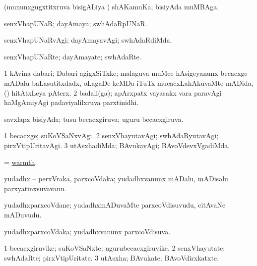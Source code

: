 \bentry
{} 
\gl{\nA}
\expl{}
\bmng
(mununxgugxtitxruva bisigALiya \vi) shAKamuKa; bisiyAda muMBAga. 
\emng
\eentry

\bentry
{} 
\gl{\gu}
\expl{}
\bmng
senxVhapUNaR; dayAmaya; swhAdaRpUNaR. 
\emng
\eentry

\bentry
{} 
\gl{\kirxvi}
\expl{}
\bmng
senxVhapUNaRvAgi; dayAmayavAgi; swhAdaRdiMda. 
\emng
\eentry

\bentry
{} 
\gl{\nA}
\expl{}
\bmng
senxVhapUNaRte; dayAmayate; swhAdaRte. 
\emng
\eentry

\bentry
{} 
\gl{\nA}
\expl{}
\bmng
\bnum
\num{1} kAvina dabari; Dabari agigxSiTxke; malaguva muMce hAsigeyanunx becacxge mADalu baLasutitxdadx, oLagaDe keMDa iTuTx mucacxLahAkuvaMte mADida, (\sA) hitAtxLeya pAterx. 
\num{2} badali(ga); apArxpatx vayasakx \mo vara paravAgi haMgAmiyAgi padaviyalilxruva parxtinidhi. 
\enum
\emng
\eentry

\bentry
{} 
\gl{\gu}
\expl{}
\bmng
savxlapx bisiyAda; tusu becacxgiruva; uguru becacxgiruva. 
\emng
\eentry

\bentry
{} 
\gl{\kirxvi}
\expl{}
\bmng
\bnum
\num{1} becacxge; suKoVSaNxvAgi. 
\num{2} senxVhayutavAgi; swhAdaRyutavAgi; pirxVtipUritavAgi. 
\num{3} utAsxhadiMda; BAvukavAgi; BAvoVdevxVgadiMda. 
\enum
\emng
\eentry

\bentry
{} 
\gl{\nA}
\expl{}
\bmng
= \hyperlink{warmth}{warmth}. 
\emng
\eentry

\bentry
{} 
\gl{\nA}
\expl{}
\bmng
yudadhx -- perxVraka, parxcoVdaka; yudadhxvanunx mADalu, mADisalu parxyatinxsuvavanu. 
\emng
\eentry

\bentry
{} 
\gl{\nA}
\expl{}
\bmng
yudadhxparxcoVdane; yudadhxmADuvaMte parxcoVdisuvudu, citAvaNe mADuvudu. 
\emng
\eentry

\bentry
{} 
\gl{\gu}
\expl{}
\bmng
yudadhxparxcoVdaka; yudadhxvanunx parxcoVdisuva. 
\emng
\eentry

\bentry
{} 
\gl{\nA}
\expl{}
\bmng
\bnum
\num{1} becacxgiruvike; suKoVSaNxte; ugurubecacxgiruvike. 
\num{2} senxVhayutate; swhAdaRte; pirxVtipUritate. 
\num{3} utAsxha; BAvukate; BAvoVdirxkatxte. 
\enum
\emng
\eentry

